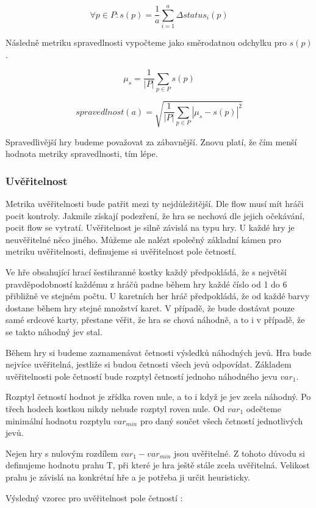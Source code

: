 	\[
	\forall p \in P : s(p) = \frac{1}{a}\sum_{i=1}^a \Delta status_i(p)
\]

Následně metriku spravedlnosti vypočteme jako směrodatnou odchylku pro $s(p)$.

	\[
	\mu_s = \frac{1}{|P|}\sum_{p \in P} s(p)
\]

	\[
	spravedlnost(a) = \sqrt{\frac{1}{|P|}\sum_{p \in P} |\mu_s - s(p)|^2}
\]

Spravedlivější hry budeme považovat za zábavnější. Znovu platí, že čím menší hodnota metriky spravedlnosti, tím lépe.

\subsubsection{Uvěřitelnost}

Metrika uvěřitelnosti bude patřit mezi ty nejdůležitější. Dle flow musí mít hráči pocit kontroly. Jakmile získají podezření, že hra se nechová dle jejich očekávání, pocit flow se vytratí. Uvěřitelnost je silně závislá na typu hry. U každé hry je neuvěřitelné něco jiného. Můžeme ale nalézt společný základní kámen pro metriku uvěřitelnosti, definujeme si uvěřitelnost pole četností.

Ve hře obsahující hrací šestihranné kostky každý předpokládá, že s největší pravděpodobností každému z hráčů padne během hry každé číslo od 1 do 6 přibližně ve stejném počtu. U karetních her hráč předpokládá, že od každé barvy dostane během hry stejné množství karet. V případě, že bude dostávat pouze samé srdcové karty, přestane věřit, že hra se chová náhodně, a to i v případě, že se takto náhodný jev stal.

Během hry si budeme zaznamenávat četnosti výsledků náhodných jevů. Hra bude nejvíce uvěřitelná, jestliže si budou četnosti všech jevů odpovídat. Základem uvěřitelnosti pole četností bude rozptyl četností jednoho náhodného jevu $var_1$.

Rozptyl četností hodnot je zřídka roven nule, a to i když je jev zcela náhodný. Po třech hodech kostkou nikdy nebude rozptyl roven nule. Od $var_1$ odečteme minimální hodnotu rozptylu $var_{min}$ pro daný součet všech četností jednotlivých jevů.

Nejen hry s nulovým rozdílem $var_1 - var_{min}$ jsou uvěřitelné. Z tohoto důvodu si definujeme hodnotu prahu T, při které je hra ještě stále zcela uvěřitelná. Velikost prahu je závislá na konkrétní hře a je potřeba ji určit heuristicky.

Výsledný vzorec pro uvěřitelnost pole četností :

